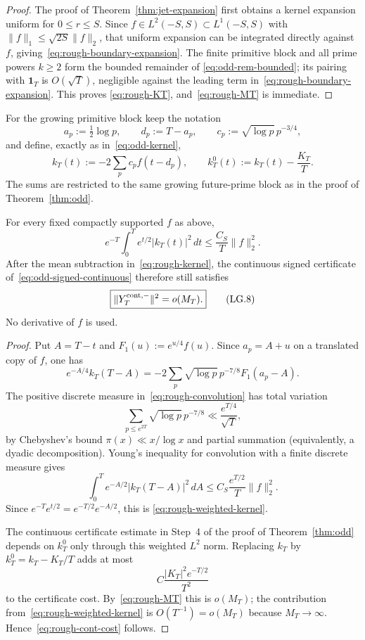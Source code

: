\begin{proof}
The proof of Theorem~\ref{thm:jet-expansion} first obtains a kernel expansion uniform
for $0\le r\le S$.  Since $f\in L^2(-S,S)\subset L^1(-S,S)$ with
$\|f\|_1\le\sqrt{2S}\|f\|_2$, that uniform expansion can be integrated directly
against $f$, giving~\eqref{eq:rough-boundary-expansion}.  The finite primitive block and
all prime powers $k\ge2$ form the bounded remainder of
\eqref{eq:odd-rem-bounded}; its pairing with $\mathbf1_T$ is $O(\sqrt T)$, negligible
against the leading term in~\eqref{eq:rough-boundary-expansion}.  This proves
\eqref{eq:rough-KT}, and~\eqref{eq:rough-MT} is immediate.
\end{proof}

For the growing primitive block keep the notation
\[
 a_p:=\tfrac12\log p,
 \qquad d_p:=T-a_p,
 \qquad c_p:=\sqrt{\log p}\,p^{-3/4},
\]
and define, exactly as in~\eqref{eq:odd-kernel},
\[
 k_T(t):=-2\sum_p c_p f(t-d_p),
 \qquad
 k_T^0(t):=k_T(t)-\frac{K_T}{T}.
\tag{LG.6}\label{eq:rough-kernel}
\]
The sums are restricted to the same growing future-prime block as in the proof of
Theorem~\ref{thm:odd}.

\begin{lemma}
\label{lem:rough-continuous-cost}
For every fixed compactly supported $f$ as above,
\[
 e^{-T}\int_0^T e^{t/2}|k_T(t)|^2\,dt
 \le \frac{C_S}{T}\|f\|_2^2.
\tag{LG.7}\label{eq:rough-weighted-kernel}
\]
After the mean subtraction in~\eqref{eq:rough-kernel}, the continuous signed
certificate of~\eqref{eq:odd-signed-continuous} therefore still satisfies
\[
 \boxed{\|Y_T^{\rm cont,-}\|^2=o(M_T).}
\tag{LG.8}\label{eq:rough-cont-cost}
\]
No derivative of $f$ is used.
\end{lemma}

\begin{proof}
Put $A=T-t$ and $F_1(u):=e^{u/4}f(u)$.  Since $a_p=A+u$ on a translated copy of
$f$, one has
\[
 e^{-A/4}k_T(T-A)
 =-2\sum_p\sqrt{\log p}\,p^{-7/8}F_1(a_p-A).
\tag{LG.9}\label{eq:rough-convolution}
\]
The positive discrete measure in~\eqref{eq:rough-convolution} has total variation
\[
 \sum_{p\le e^{2T}}\sqrt{\log p}\,p^{-7/8}
 \ll \frac{e^{T/4}}{\sqrt T},
\tag{LG.10}\label{eq:rough-seven-eight}
\]
by Chebyshev's bound $\pi(x)\ll x/\log x$ and partial summation (equivalently, a
dyadic decomposition).  Young's inequality for convolution with a finite discrete
measure gives
\[
 \int_0^T e^{-A/2}|k_T(T-A)|^2\,dA
 \le C_S\frac{e^{T/2}}{T}\|f\|_2^2.
\]
Since $e^{-T}e^{t/2}=e^{-T/2}e^{-A/2}$, this is
\eqref{eq:rough-weighted-kernel}.

The continuous certificate estimate in Step~4 of the proof of
Theorem~\ref{thm:odd} depends on $k_T^0$ only through this weighted $L^2$ norm.
Replacing $k_T$ by $k_T^0=k_T-K_T/T$ adds at most
\[
 C\frac{|K_T|^2e^{-T/2}}{T^2}
\]
to the certificate cost.  By~\eqref{eq:rough-MT} this is $o(M_T)$; the contribution
from~\eqref{eq:rough-weighted-kernel} is $O(T^{-1})=o(M_T)$ because
$M_T\to\infty$.  Hence~\eqref{eq:rough-cont-cost} follows.
\end{proof}

